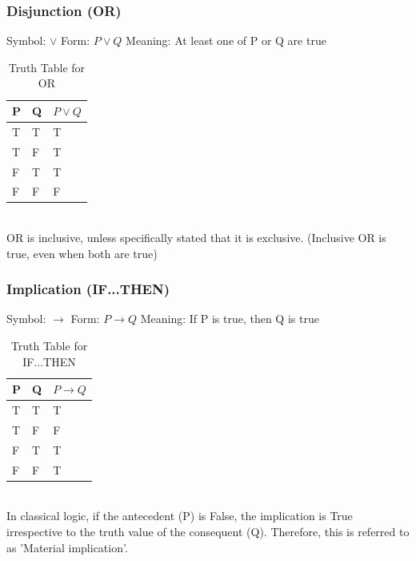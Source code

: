 \documentclass{article}
\begin{document}
\subsubsection*{Disjunction (OR)}
Symbol: $\lor$ \hspace{1.5cm}
Form: $P \lor Q$ \hspace{1.5cm}
Meaning: At least one of P or Q are true \\
\begin{table}[h]
\centering
\renewcommand{\arraystretch}{1.01}
\begin{tabular}{|>{\centering\arraybackslash}p{2cm}|>{\centering\arraybackslash}p{2cm}|>{\centering\arraybackslash}p{2cm}|}
\hline
P & Q &  $P \lor Q$\\
\hline
T & T & T \\
\hline
T & F & T \\
\hline
F & T & T \\
\hline
F & F & F \\
\hline
\end{tabular}
\caption{Truth Table for OR}
\end{table}\\
OR is inclusive, unless specifically stated that it is exclusive. (Inclusive OR is true, even when both are true)\\

\subsubsection*{Implication (IF...THEN)}
Symbol: $\rightarrow$ \hspace{1.5cm}
Form: $P \rightarrow Q$ \hspace{1.5cm}
Meaning: If P is true, then Q is true \\
\begin{table}[h]
\centering
\renewcommand{\arraystretch}{1.01}
\begin{tabular}{|>{\centering\arraybackslash}p{2cm}|>{\centering\arraybackslash}p{2cm}|>{\centering\arraybackslash}p{2cm}|}
\hline
P & Q &  $P \rightarrow Q$\\
\hline
T & T & T \\
\hline
T & F & F \\
\hline
F & T & T \\
\hline
F & F & T \\
\hline
\end{tabular}
\caption{Truth Table for IF...THEN}
\end{table}\\
In classical logic, if the antecedent (P) is False, the implication is True irrespective to the truth value of the consequent (Q).
Therefore, this is referred to as 'Material implication'.\\
\end{document}
